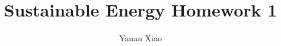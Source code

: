 \documentclass[12pt]{article}
\begin{document}
\title{Sustainable Energy Homework 1}
\author{Yanan Xiao}
\maketitle{}
\end{document}
